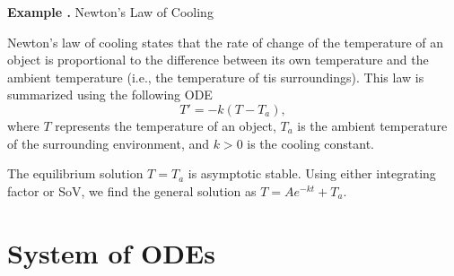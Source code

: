 \documentclass[12pt, a4paper]{article}
\newcounter{index}[subsection]
\newenvironment*{eg}{\begin{framed}\par\noindent\textbf{Example \thesubsection.\stepcounter{index}\theindex}}{\par\end{framed}}
\begin{document}
\begin{eg}
	Newton's Law of Cooling\par 
	Newton's law of cooling states that the rate of change of the temperature of an object is proportional to the difference between its own temperature and the ambient temperature (i.e., the temperature of tis surroundings). This law is summarized using the following ODE \[T'=-k(T-T_a),\] where $T$ represents the temperature of an object, $T_a$ is the ambient temperature of the surrounding environment, and $k>0$ is the cooling constant. \par The equilibrium solution $T=T_a$ is asymptotic stable. Using either integrating factor or SoV, we find the general solution as $T=Ae^{-kt}+T_a.$
\end{eg}

\newpage
\section{System of ODEs}
\end{document}
